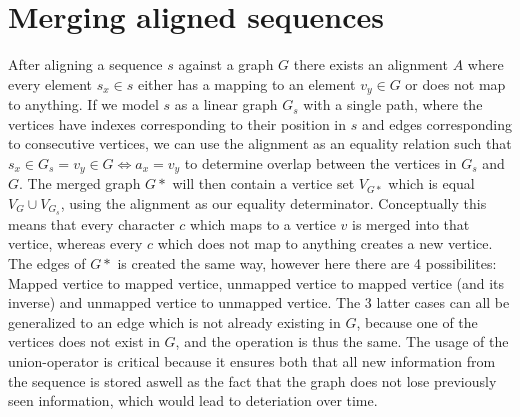 \documentclass{article}
\begin{document}
\section{Merging aligned sequences}
After aligning a sequence $s$ against a graph $G$ there exists an alignment $A$ where every element $s_x \in s$ either has a mapping to an element $v_y \in G$ or does not map to anything. If we model $s$ as a linear graph $G_s$ with a single path, where the vertices have indexes corresponding to their position in $s$ and edges corresponding to consecutive vertices, we can use the alignment as an equality relation such that $s_x \in G_s = v_y \in G \iff a_x = v_y$ to determine overlap between the vertices in $G_s$ and $G$. The merged graph $G*$ will then contain a vertice set $V_{G*}$ which is equal $V_G \cup V_{G_s}$, using the alignment as our equality determinator. Conceptually this means that every character $c$ which maps to a vertice $v$ is merged into that vertice, whereas every $c$ which does not map to anything creates a new vertice. The edges of $G*$ is created the same way, however here there are 4 possibilites: Mapped vertice to mapped vertice, unmapped vertice to mapped vertice (and its inverse) and unmapped vertice to unmapped vertice. The 3 latter cases can all be generalized to an edge which is not already existing in $G$, because one of the vertices does not exist in $G$, and the operation is thus the same. The usage of the union-operator is critical because it ensures both that all new information from the sequence is stored aswell as the fact that the graph does not lose previously seen information, which would lead to deteriation over time.
\end{document}
